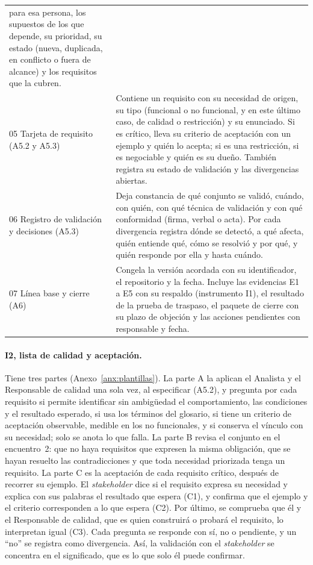 \documentclass[12pt,letterpaper,oneside]{report}
\begin{document}
\begin{table}[H]
\begin{tabularx}{\textwidth}{@{}L{3.9cm}Y@{}}
para esa persona, los supuestos de los que depende, su prioridad, su estado
(nueva, duplicada, en conflicto o fuera de alcance) y los requisitos que la
cubren. \\
05 Tarjeta de requisito (A5.2 y A5.3) & Contiene un requisito con su necesidad
de origen, su tipo (funcional o no funcional, y en este último caso, de calidad
o restricción) y su enunciado. Si es
crítico, lleva su criterio de aceptación con un ejemplo y quién lo acepta; si es
una restricción, si es negociable y quién es su dueño. También registra su
estado de validación y las divergencias abiertas. \\
06 Registro de validación y decisiones (A5.3) & Deja constancia de qué conjunto
se validó, cuándo, con quién, con qué técnica de validación y con qué conformidad (firma,
verbal o acta). Por cada divergencia registra dónde se detectó, a qué afecta,
quién entiende qué, cómo se resolvió y por qué, y quién responde por ella y
hasta cuándo. \\
07 Línea base y cierre (A6) & Congela la versión acordada con su
identificador, el repositorio y la fecha. Incluye las evidencias E1 a E5 con su
respaldo (instrumento I1), el resultado de la prueba de traspaso, el paquete de
cierre con su plazo de objeción y las acciones pendientes con responsable y
fecha. \\
\bottomrule
\end{tabularx}
\end{table}

\paragraph{I2, lista de calidad y aceptación.}
Tiene tres partes (Anexo~\ref{anx:plantillas}). La parte A la aplican el
Analista y el Responsable de calidad una sola vez, al especificar (A5.2), y
pregunta por cada requisito si permite identificar sin ambigüedad el
comportamiento, las condiciones y el resultado esperado, si usa los términos del
glosario, si tiene un criterio de aceptación observable, medible en los no
funcionales, y si conserva el vínculo con su necesidad; solo se anota lo que
falla. La parte B revisa el conjunto en el encuentro~2: que no haya requisitos
que expresen la misma obligación, que se hayan resuelto las contradicciones y
que toda necesidad priorizada tenga un requisito. La parte C es la aceptación de cada requisito crítico, después de recorrer su
ejemplo. El \textit{stakeholder} dice si el requisito expresa su necesidad y
explica con sus palabras el resultado que espera (C1), y confirma que el ejemplo
y el criterio corresponden a lo que espera (C2). Por último, se comprueba que él
y el Responsable de calidad, que es quien construirá o probará el requisito, lo
interpretan igual (C3). Cada
pregunta se responde con sí, no o pendiente, y un ``no'' se registra como
divergencia. Así, la validación con el \textit{stakeholder} se concentra en el
significado, que es lo que solo él puede confirmar.
\end{document}
